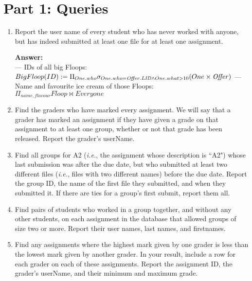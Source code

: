\documentclass{article}
\newcommand{\var}[1]{\mathit{#1}}
\begin{document}
\section*{Part 1: Queries}

\begin{enumerate}

\item   %
Report the user name of every student who has never worked with anyone, but
has indeed submitted at least one file for at least one assignment.

{\bf Answer:}\\[5pt]
{\large
--- IDs of all big Floops:  \\[5pt]
$
BigFloop(ID) := 
\Pi_{One.who} \sigma_{One.who = \var{Offer.LID} \wedge One.what > 10} (One \times \var{Offer}) \\[10pt]
$
--- Name and favourite ice cream of those Floops: \\[5pt]
$
\Pi_{name, flavour} Floop \bowtie Everyone
$
}

\item   %
Find the graders who have marked every assignment.
We will say that a grader has marked an assignment if
they have given a grade on that assignment to at least one group,
whether or not that grade has been released.
Report the grader's userName.

\item   %
Find all groups for A2
({\it i.e.}, the assignment whose description is ``A2")
whose last submission was after the due date, but who submitted at least two different files
({\it i.e.}, files with two different names) before the due date.
Report the group ID, the name of the first file they submitted, and when they submitted it.
If there are ties for a group's first submit, report them all.

\item   %
Find pairs of students who worked in a group together, and without any other students,
on each assignment in the database that allowed groups of size two or more.
Report their user names, last names, and firstnames.

\item   %
Find any assignments where 
the highest mark given by one grader is less than 
the lowest mark given by another grader.
In your result, include a row for each grader on each of these assignments.
Report the assignment ID, the grader's userName, and their minimum and maximum grade.


\end{enumerate}
\end{document}
